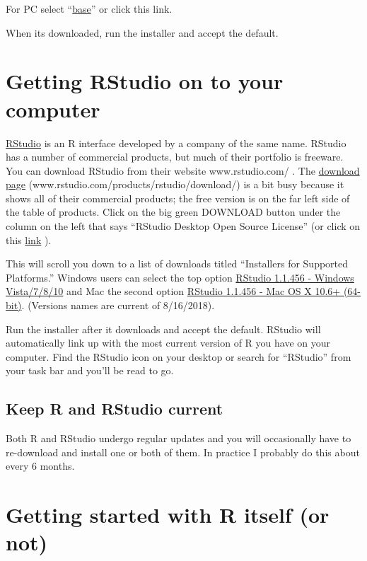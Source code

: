 \documentclass[]{book}
\theoremstyle{definition}
\theoremstyle{definition}
\theoremstyle{definition}
\theoremstyle{remark}
\begin{document}
For PC select
``\href{https://cran.r-project.org/bin/windows/base/}{base}'' or click
this link.

When its downloaded, run the installer and accept the default.

\section{Getting RStudio on to your
computer}\label{getting-rstudio-on-to-your-computer}

\href{www.rstudio.com/}{RStudio} is an R interface developed by a
company of the same name. RStudio has a number of commercial products,
but much of their portfolio is freeware. You can download RStudio from
their website www.rstudio.com/ . The
\href{https://www.rstudio.com/products/rstudio/download/}{download page}
(www.rstudio.com/products/rstudio/download/) is a bit busy because it
shows all of their commercial products; the free version is on the far
left side of the table of products. Click on the big green DOWNLOAD
button under the column on the left that says ``RStudio Desktop Open
Source License'' (or click on this
\href{https://www.rstudio.com/products/rstudio/download/\#download}{link}
).

This will scroll you down to a list of downloads titled ``Installers for
Supported Platforms.'' Windows users can select the top option
\href{https://download1.rstudio.org/RStudio-1.1.456.exe}{RStudio 1.1.456
- Windows Vista/7/8/10} and Mac the second option
\href{https://download1.rstudio.org/RStudio-1.1.456.dmg}{RStudio 1.1.456
- Mac OS X 10.6+ (64-bit)}. (Versions names are current of 8/16/2018).

Run the installer after it downloads and accept the default. RStudio
will automatically link up with the most current version of R you have
on your computer. Find the RStudio icon on your desktop or search for
``RStudio'' from your task bar and you'll be read to go.

\subsection{Keep R and RStudio
current}\label{keep-r-and-rstudio-current}

Both R and RStudio undergo regular updates and you will occasionally
have to re-download and install one or both of them. In practice I
probably do this about every 6 months.

\section{Getting started with R itself (or
not)}\label{getting-started-with-r-itself-or-not}
\end{document}
